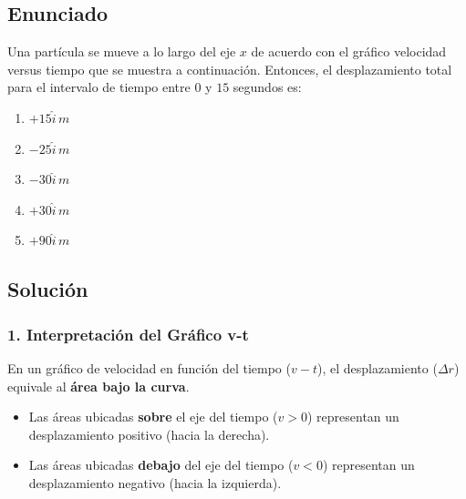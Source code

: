 \documentclass[12pt, a4paper]{article}
\begin{document}
\subsection*{Enunciado}
Una partícula se mueve a lo largo del eje $x$ de acuerdo con el gráfico velocidad versus tiempo que se muestra a continuación. Entonces, el desplazamiento total para el intervalo de tiempo entre $0$ y $15$ segundos es:

\begin{enumerate}[label=\alph*)]
    \item $+15\hat{i} \, \si{m}$
    \item $-25\hat{i} \, \si{m}$
    \item $-30\hat{i} \, \si{m}$
    \item $+30\hat{i} \, \si{m}$
    \item $+90\hat{i} \, \si{m}$
\end{enumerate}

\begin{center}
\end{center}

\subsection*{Solución}

\subsubsection*{1. Interpretación del Gráfico v-t}
En un gráfico de velocidad en función del tiempo ($v-t$), el desplazamiento ($\Delta r$) equivale al \textbf{área bajo la curva}. 
\begin{itemize}
    \item Las áreas ubicadas \textbf{sobre} el eje del tiempo ($v > 0$) representan un desplazamiento positivo (hacia la derecha).
    \item Las áreas ubicadas \textbf{debajo} del eje del tiempo ($v < 0$) representan un desplazamiento negativo (hacia la izquierda).
\end{itemize}
\end{document}
